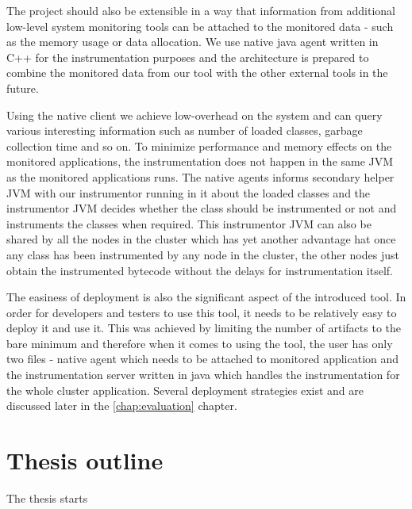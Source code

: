 The project should also be extensible in a way that information from additional low-level system monitoring tools can be attached to the monitored data - such as the memory usage or data allocation. We use native java agent written in C++ for the instrumentation purposes and the architecture is prepared to combine the monitored data from our tool with the other external tools in the future.  

Using the native client we achieve low-overhead on the system and can query various interesting information such as number of loaded classes, garbage collection time and so on. To minimize performance and memory effects on the monitored applications, the instrumentation does not happen in the same JVM as the monitored applications runs. The native agents informs secondary helper JVM with our instrumentor running in it about the loaded classes and the instrumentor JVM decides whether the class should be instrumented or not and instruments the classes when required. This instrumentor JVM can also be shared by all the nodes in the cluster which has yet another advantage hat once any class has been instrumented by any node in the cluster, the other nodes just obtain the instrumented bytecode without the delays for instrumentation itself.

The easiness of deployment is also the significant aspect of the introduced tool. In order for developers and testers to use this tool, it needs to be relatively easy to deploy it and use it. This was achieved by limiting the number of artifacts to the bare minimum and therefore when it comes to using the tool, the user has only two files - native agent which needs to be attached to monitored application and the instrumentation server written in java which handles the instrumentation for the whole cluster application. Several deployment strategies exist and are discussed later in the \ref{chap:evaluation} chapter.

\section{Thesis outline}
The thesis starts 

